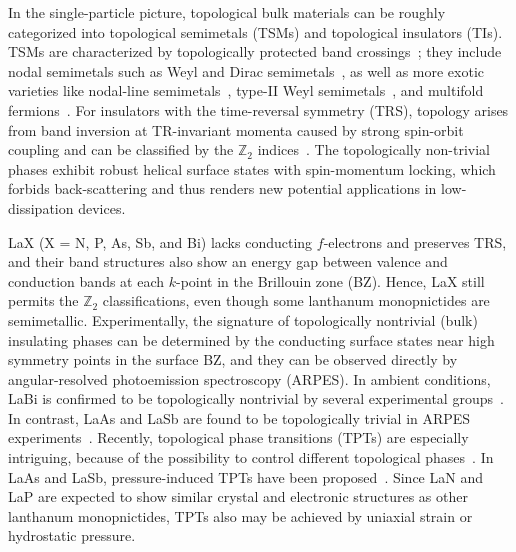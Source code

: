     In the single-particle picture, topological bulk materials can be roughly categorized into topological semimetals (TSMs) and topological insulators (TIs). TSMs are characterized by topologically protected band crossings~\cite{TSM}; they include nodal semimetals such as Weyl and Dirac semimetals~\cite{yan2017,armitage2018}, as well as more exotic varieties like nodal-line semimetals~\cite{fang2016}, type-II Weyl semimetals~\cite{soluyanov2015}, and multifold fermions~\cite{fang2012,wieder2016,bradlyn2016}. For insulators with the time-reversal symmetry (TRS), topology arises from band inversion at TR-invariant momenta caused by strong spin-orbit coupling and can be classified by the $\mathbb{Z}_2$ indices~\cite{TI_hasan2010,qi2011}. The topologically non-trivial phases exhibit robust helical surface states with spin-momentum locking, which forbids back-scattering and thus renders new potential applications in low-dissipation devices.
	 
	 LaX (X = N, P, As, Sb, and Bi) lacks conducting $f$-electrons and preserves TRS, and their band structures also show an energy gap between valence and conduction bands at each $k$-point in the Brillouin zone (BZ). Hence, LaX still permits the $\mathbb{Z}_2$ classifications, even though some lanthanum monopnictides are semimetallic. Experimentally, the signature of topologically nontrivial (bulk) insulating phases can be determined by the conducting surface states near high symmetry points in the surface BZ, and they can be observed directly by angular-resolved photoemission spectroscopy (ARPES). In ambient conditions, LaBi is confirmed to be topologically nontrivial by several experimental groups~\cite{LaBi_topo_wu2016, LaBi_topo_ncomms13942, LaBi_topo_ARPES_lou2017, LaBi_LaSb_topo_ARPES_niu2016, LaBi_topo_PRB_feng2018, LaX_arpes_nummy2018}. In contrast, LaAs and LaSb are found to be topologically trivial in ARPES experiments~\cite{LaSb_ARPES_zeng2016, LaBi_LaSb_topo_ARPES_niu2016, LaX_arpes_nummy2018}. Recently, topological phase transitions (TPTs) are especially intriguing, because of the possibility to control different topological phases~\cite{TPT_2012, monserrat2017antiferroelectric, fan2017transition, ZrTe5_2019,sie2019ultrafast, vaswani2020light, PhysRevB.103.115207}. In LaAs and LaSb, pressure-induced TPTs have been proposed~\cite{LaAs_hydrostatic_pressure, LaSb_topo_transition_HSE_guo2017}. Since LaN and LaP are expected to show similar crystal and electronic structures as other lanthanum monopnictides, TPTs also may be achieved by uniaxial strain or hydrostatic pressure.

